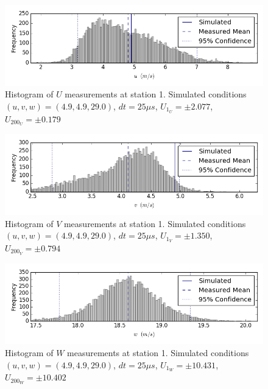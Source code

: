 \begin{figure}[H]
\centering
\includegraphics[width=6in]{figs/Ely_May28th01001/uncertainty_Ely_May28th01001_U}
\caption{Histogram of $U$ measurements at station 1. Simulated conditions $(u,v,w)=(4.9, 4.9, 29.0)$, $dt=25 \mu s$, $U_{1_{U}}=\pm 2.077$, $U_{200_{U}}=\pm 0.179$}
\label{fig:uncertainty_Ely_May28th01001_U}
\end{figure}


\begin{figure}[H]
\centering
\includegraphics[width=6in]{figs/Ely_May28th01001/uncertainty_Ely_May28th01001_V}
\caption{Histogram of $V$ measurements at station 1. Simulated conditions $(u,v,w)=(4.9, 4.9, 29.0)$, $dt=25 \mu s$, $U_{1_{V}}=\pm 1.350$, $U_{200_{V}}=\pm 0.794$}
\label{fig:uncertainty_Ely_May28th01001_V}
\end{figure}


\begin{figure}[H]
\centering
\includegraphics[width=6in]{figs/Ely_May28th01001/uncertainty_Ely_May28th01001_W}
\caption{Histogram of $W$ measurements at station 1. Simulated conditions $(u,v,w)=(4.9, 4.9, 29.0)$, $dt=25 \mu s$, $U_{1_{W}}=\pm 10.431$, $U_{200_{W}}=\pm 10.402$}
\label{fig:uncertainty_Ely_May28th01001_W}
\end{figure}


